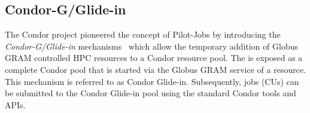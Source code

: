 \documentclass[conference]{IEEEtran}
\begin{document}
\subsection{Condor-G/Glide-in}

The Condor project pioneered the concept of Pilot-Jobs by introducing the
\textit{Condor-G/Glide-in} mechanisms~\cite{condor-g} which allow the
temporary addition of Globus GRAM controlled HPC resources to a Condor
resource pool. The \pilot is exposed as a complete Condor
pool that is started via the Globus GRAM service of a resource. This mechanism
is referred to as Condor Glide-in. Subsequently, jobs (CUs) can be submitted
to the Condor Glide-in pool using the standard Condor tools and APIs.

% 

\end{document}
